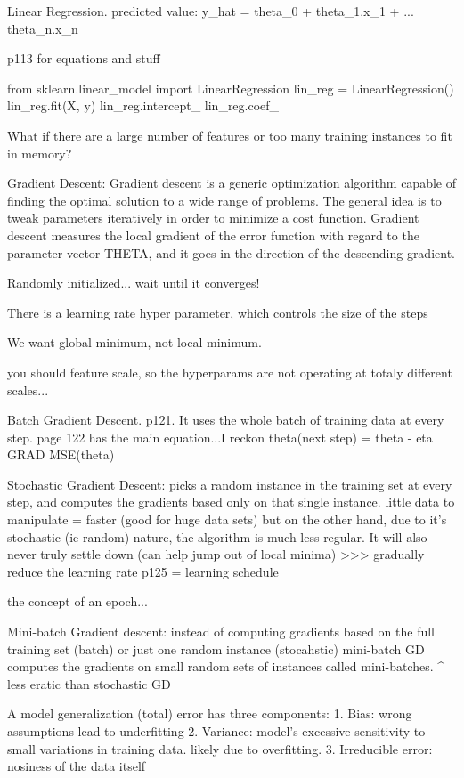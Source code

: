 Linear Regression.
predicted value: y_hat = theta_0 + theta_1.x_1 + ... theta_n.x_n

p113 for equations and stuff

from sklearn.linear_model import LinearRegression
lin_reg = LinearRegression()
lin_reg.fit(X, y)
lin_reg.intercept_
lin_reg.coef_

What if there are a large number of features
or too many training instances to fit in memory?

Gradient Descent:
Gradient descent is a generic optimization algorithm capable of finding the optimal solution to a wide range of problems. 
The general idea is to tweak parameters iteratively in order to minimize a cost function.
Gradient descent measures the local gradient of the error function with regard to the parameter vector THETA,
and it goes in the direction of the descending gradient.

Randomly initialized... wait until it converges!

There is a learning rate hyper parameter, which controls the size of the steps

We want global minimum, not local minimum.

you should feature scale, so the hyperparams are not operating at totaly different scales...

Batch Gradient Descent. p121.
It uses the whole batch of training data at every step.
page 122 has the main equation...I reckon
theta(next step) = theta - eta GRAD MSE(theta)

Stochastic Gradient Descent:
picks a random instance in the training set at every step,
and computes the gradients based only on that single instance.
little data to manipulate = faster (good for huge data sets)
but on the other hand,
due to it's stochastic (ie random) nature,
the algorithm is much less regular.
It will also never truly settle down (can help jump out of local minima)
>>> gradually reduce the learning rate p125 = learning schedule

the concept of an epoch...

Mini-batch Gradient descent:
instead of computing gradients based on the full training set (batch)
or just one random instance (stocahstic)
mini-batch GD computes the gradients on small random sets of instances called mini-batches.
^ less eratic than stochastic GD

A model generalization (total) error has three components:
1. Bias: wrong assumptions lead to underfitting
2. Variance: model's excessive sensitivity to small variations in training data. likely due to overfitting.
3. Irreducible error: nosiness of the data itself


